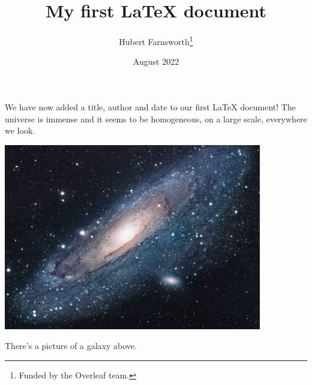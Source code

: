 \documentclass[12pt, letterpaper]{article}
\title{My first LaTeX document}
\author{Hubert Farnsworth\thanks{Funded by the Overleaf team.}}
\date{August 2022}
\begin{document}
\usetikzlibrary{external}
\immediate{}
\tikzexternalize[
    prefix=tmp/,
    mode=list and make,
]

\maketitle
We have now added a title, author and date to our first \LaTeX{} document!
The universe is immense and it seems to be homogeneous, 
on a large scale, everywhere we look.
\\
\begin{center}
    \includegraphics{universe}
\end{center}

There's a picture of a galaxy above.
\end{document}
